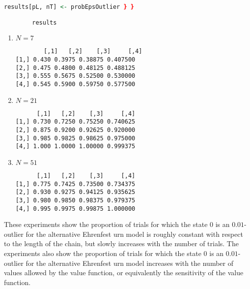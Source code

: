\documentclass[12pt]{article}
\begin{document}
\begin{solution}
\begin{lstlisting}[language=R]
        results[pL, nT] <- probEpsOutlier } }

        results
    \end{lstlisting}

    \begin{enumerate}
        \item
            \( N= 7 \)

\begin{verbatim}
        [,1]   [,2]    [,3]     [,4]
[1,] 0.430 0.3975 0.38875 0.407500
[2,] 0.475 0.4800 0.48125 0.488125
[3,] 0.555 0.5675 0.52500 0.530000
[4,] 0.545 0.5900 0.59750 0.577500
\end{verbatim}
        \item

            \( N = 21 \)

\begin{verbatim}
      [,1]   [,2]    [,3]     [,4]
[1,] 0.730 0.7250 0.75250 0.740625
[2,] 0.875 0.9200 0.92625 0.920000
[3,] 0.985 0.9825 0.98625 0.975000
[4,] 1.000 1.0000 1.00000 0.999375
\end{verbatim}

        \item
            \( N = 51 \)

\begin{verbatim}
      [,1]   [,2]    [,3]     [,4]
[1,] 0.775 0.7425 0.73500 0.734375
[2,] 0.930 0.9275 0.94125 0.935625
[3,] 0.980 0.9850 0.98375 0.979375
[4,] 0.995 0.9975 0.99875 1.000000
\end{verbatim}

    \end{enumerate}

    These experiments show the proportion of trials for which the state \(
    0 \) is an \( 0.01 \)-outlier for the alternative Ehrenfest urn
    model is roughly constant with respect to the length of the chain,
    but slowly increases with the number of trials.  The experiments
    also show the proportion of trials for which the state \( 0 \) is an
    \( 0.01 \)-outlier for the alternative Ehrenfest urn model increases
    with the number of values allowed by the value function, or
    equivalently the sensitivity of the value function.
\end{solution}
\end{document}
